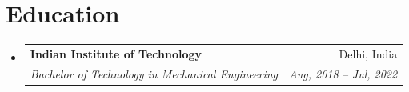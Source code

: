 \documentclass[letterpaper,11pt]{article}
\makeatletter
\newcommand{\resumeSubheading}[4]{
  \vspace{-2pt}\item
    \begin{tabular*}{0.97\textwidth}[t]{l@{\extracolsep{\fill}}r}
      \textbf{#1} & #2 \\
      \textit{\small#3} & \textit{\small #4} \\
    \end{tabular*}\vspace{-7pt}
}
\newcommand{\resumeSubHeadingListStart}{\begin{itemize}[leftmargin=0.15in, label={}]}
\newcommand{\resumeSubHeadingListEnd}{\end{itemize}}
\makeatother
\begin{document}
\section{Education}
  \resumeSubHeadingListStart
    \resumeSubheading
      {Indian Institute of Technology}{Delhi, India}
      {Bachelor of Technology in Mechanical Engineering}{Aug, 2018 -- Jul, 2022}
  \resumeSubHeadingListEnd


\end{document}
